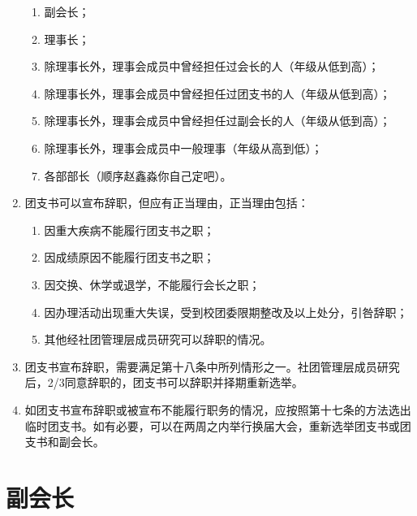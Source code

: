\begin{enumerate}[resume]
    \begin{enumerate}
        \item 副会长；
        \item 理事长；
        \item 除理事长外，理事会成员中曾经担任过会长的人（年级从低到高）；
        \item 除理事长外，理事会成员中曾经担任过团支书的人（年级从低到高）；
        \item 除理事长外，理事会成员中曾经担任过副会长的人（年级从低到高）；
        \item 除理事长外，理事会成员中一般理事（年级从高到低）；
        \item 各部部长（顺序赵鑫淼你自己定吧）。
    \end{enumerate}
    
    \item 团支书可以宣布辞职，但应有正当理由，正当理由包括：
    
    \begin{enumerate}
        \item 因重大疾病不能履行团支书之职；
        \item 因成绩原因不能履行团支书之职；
        \item 因交换、休学或退学，不能履行会长之职；
        \item 因办理活动出现重大失误，受到校团委限期整改及以上处分，引咎辞职；
        \item 其他经社团管理层成员研究可以辞职的情况。
    \end{enumerate}

    \item 团支书宣布辞职，需要满足第十八条中所列情形之一。社团管理层成员研究后，2/3同意辞职的，团支书可以辞职并择期重新选举。
    
    \item 如团支书宣布辞职或被宣布不能履行职务的情况，应按照第十七条的方法选出临时团支书。如有必要，可以在两周之内举行换届大会，重新选举团支书或团支书和副会长。
\end{enumerate}

\section{副会长}



